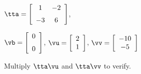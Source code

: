 {$\tta = \left[ \begin {array}{cc} 1&-2\\ \noalign{\medskip}-3&6 \end {array} \right] $, 

$\vb=\left[ \begin {array}{c} 0\\ \noalign{\medskip}0 \end {array} \right] $, 
$\vu = \left[ \begin {array}{c} 2\\ 1 \end{array} \right]$, $\vv = \left[ \begin{array}{c} -10\\ -5 \end{array} \right]$ }
{Multiply $\tta\vu$ and $\tta\vv$ to verify.}




